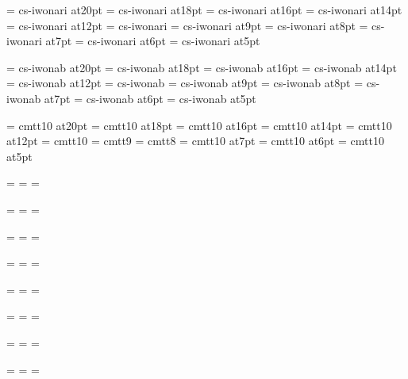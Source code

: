 \font\twentysl=     cs-iwonari at20pt
\font\eighteensl=   cs-iwonari at18pt
\font\sixteensl=    cs-iwonari at16pt
\font\fourteensl=   cs-iwonari at14pt
\font\twelvesl=     cs-iwonari at12pt
\font\tensl=        cs-iwonari
\font\ninesl=       cs-iwonari at9pt
\font\eightsl=      cs-iwonari at8pt
\font\sevensl=      cs-iwonari at7pt
\font\sixsl=        cs-iwonari at6pt
\font\fivesl=       cs-iwonari at5pt

\font\twentybf=     cs-iwonab at20pt
\font\eighteenbf=   cs-iwonab at18pt
\font\sixteenbf=    cs-iwonab at16pt
\font\fourteenbf=   cs-iwonab at14pt
\font\twelvebf=     cs-iwonab at12pt
\font\tenbf=        cs-iwonab
\font\ninebf=       cs-iwonab at9pt
\font\eightbf=      cs-iwonab at8pt
\font\sevenbf=      cs-iwonab at7pt
\font\sixbf=        cs-iwonab at6pt
\font\fivebf=       cs-iwonab at5pt

\font\twentytt=     cmtt10 at20pt
\font\eighteentt=   cmtt10 at18pt
\font\sixteentt=    cmtt10 at16pt
\font\fourteentt=   cmtt10 at14pt
\font\twelvett=     cmtt10 at12pt
\font\tentt=        cmtt10
\font\ninett=       cmtt9
\font\eighttt=      cmtt8
\font\seventt=      cmtt10 at7pt
\font\sixtt=        cmtt10 at6pt
\font\fivett=       cmtt10 at5pt




=\tenrm
{}=\sevenrm
{}=\fiverm
\def\rm{\fam=0 \tenrm}

=\teni
{}=\seveni
{}=\fivei
\def\mit{\fam=1}

=\tensy
{}=\sevensy
{}=\fivesy
\def\cal{\fam=2}

=\tenex
{}=\sevenex
{}=\fiveex


\def\it{\fam=\itfam \tenit}
\textfont\itfam=\tenit
\scriptfont\itfam=\sevenit
\scriptscriptfont\itfam=\fiveit

\def\sl{\fam=\slfam \tensl}
\textfont\slfam=\tensl
\scriptfont\slfam=\sevensl
\scriptscriptfont\slfam=\fivesl

\def\bf{\fam=\bffam \tenbf}
\textfont\bffam=\tenbf
\scriptfont\bffam=\sevenbf
\scriptscriptfont\bffam=\fivebf

\def\tt{\fam=\ttfam \tentt}
\textfont\ttfam=\tentt
\scriptfont\ttfam=\seventt
\scriptscriptfont\ttfam=\fivett

